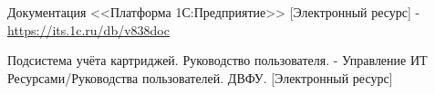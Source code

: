 \begin{thebibliography}{9}
        Документация <<Платформа 1С:Предприятие>> [Электронный ресурс] - \href{https://its.1c.ru/db/v838doc}{https://its.1c.ru/db/v838doc}

        Подсистема учёта картриджей. Руководство пользователя. - Управление ИТ Ресурсами/Руководства пользователей. ДВФУ. [Электронный ресурс]


\end{thebibliography}
